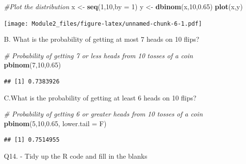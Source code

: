 \documentclass[]{book}
\newenvironment{Shaded}{\begin{snugshade}}{\end{snugshade}}
\newcommand{\KeywordTok}[1]{\textcolor[rgb]{0.13,0.29,0.53}{\textbf{#1}}}
\newcommand{\DataTypeTok}[1]{\textcolor[rgb]{0.13,0.29,0.53}{#1}}
\newcommand{\DecValTok}[1]{\textcolor[rgb]{0.00,0.00,0.81}{#1}}
\newcommand{\FloatTok}[1]{\textcolor[rgb]{0.00,0.00,0.81}{#1}}
\newcommand{\StringTok}[1]{\textcolor[rgb]{0.31,0.60,0.02}{#1}}
\newcommand{\CommentTok}[1]{\textcolor[rgb]{0.56,0.35,0.01}{\textit{#1}}}
\newcommand{\NormalTok}[1]{#1}
\theoremstyle{definition}
\theoremstyle{definition}
\theoremstyle{definition}
\theoremstyle{remark}
\begin{document}
\begin{Shaded}
\begin{Highlighting}[]
\CommentTok{#Plot the distribution}
\NormalTok{x <-}\StringTok{ }\KeywordTok{seq}\NormalTok{(}\DecValTok{1}\NormalTok{,}\DecValTok{10}\NormalTok{,}\DataTypeTok{by =} \DecValTok{1}\NormalTok{)}
\NormalTok{y <-}\StringTok{ }\KeywordTok{dbinom}\NormalTok{(x,}\DecValTok{10}\NormalTok{,}\FloatTok{0.65}\NormalTok{)}
\KeywordTok{plot}\NormalTok{(x,y)}
\end{Highlighting}
\end{Shaded}

\texttt{[image: Module2\_files/figure-latex/unnamed-chunk-6-1.pdf]}

B. What is the probability of getting at most 7 heads on 10 flips?

\begin{Shaded}
\begin{Highlighting}[]
\CommentTok{# Probability of getting 7 or less heads from 10 tosses of a coin}
\KeywordTok{pbinom}\NormalTok{(}\DecValTok{7}\NormalTok{,}\DecValTok{10}\NormalTok{,}\FloatTok{0.65}\NormalTok{)}
\end{Highlighting}
\end{Shaded}

\begin{verbatim}
## [1] 0.7383926
\end{verbatim}

C.What is the probability of getting at least 6 heads on 10 flips?

\begin{Shaded}
\begin{Highlighting}[]
\CommentTok{# Probability of getting 6 or greater heads from 10 tosses of a coin}
\KeywordTok{pbinom}\NormalTok{(}\DecValTok{5}\NormalTok{,}\DecValTok{10}\NormalTok{,}\FloatTok{0.65}\NormalTok{, }\DataTypeTok{lower.tail =}\NormalTok{ F)}
\end{Highlighting}
\end{Shaded}

\begin{verbatim}
## [1] 0.7514955
\end{verbatim}

Q14. - Tidy up the R code and fill in the blanks
\end{document}
